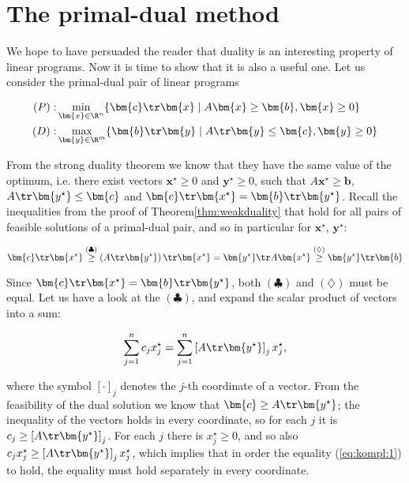 \section{The primal-dual method}

\noindent
We hope to have persuaded the reader that duality is an interesting property of linear programs. 
Now it is time to show that it is also a useful one. Let us consider the primal-dual pair of
linear programs

\begin{eqnarray*}
  (P):&\min\limits_{\bm{x}\in\R^n}\{\bm{c}\tr\bm{x}\mid A\bm{x}\ge\bm{b}, \bm{x}\ge 0\}\\
  (D):&\max\limits_{\bm{y}\in\R^m}\{\bm{b}\tr\bm{y}\mid A\tr\bm{y}\le\bm{c}, \bm{y}\ge 0\}
\end{eqnarray*}

\noindent
From the strong duality theorem we know that they have the same value of the optimum, i.e. there
exist vectors  $\bm{x^\star}\ge0$
and $\bm{y^\star}\ge0$, such that $A\bm{x^\star}\ge\bm{b}$, $A\tr\bm{y^\star}\le\bm{c}$
and $\bm{c}\tr\bm{x^\star}=\bm{b}\tr\bm{y^\star}$.
Recall the inequalities from the proof of Theorem\ref{thm:weakduality} that hold for
all pairs of feasible solutions of a primal-dual pair, and so in particular for $\bm{x^\star}$, $\bm{y^\star}$:

\begin{equation}
  \label{eq:proofSlack}
  \bm{c}\tr\bm{x^\star}\stackrel{(\clubsuit)}{\ge}\left(A\tr\bm{y^\star}\right)\tr\bm{x^\star}
=\bm{y^\star}\tr A\bm{x^\star}\stackrel{(\diamondsuit)}{\ge}\bm{y^\star}\tr\bm{b}
\end{equation}

\noindent
Since $\bm{c}\tr\bm{x^\star}=\bm{b}\tr\bm{y^\star}$, both $(\clubsuit)$ and $(\diamondsuit)$ 
must be equal. Let us have a look at the  $(\clubsuit)$, and expand the scalar product of vectors into a sum:

\begin{equation}
  \label{eq:kompl:1}
  \sum_{j=1}^n c_jx^\star_j=\sum_{j=1}^n\left[A\tr\bm{y^\star}\right]_jx^\star_j,
\end{equation}

\noindent
where the symbol $[\cdot]_j$ denotes the  $j$-th coordinate of a vector. 
From the feasibility of the dual solution we know that
$\bm{c}\ge A\tr\bm{y^\star}$; 
the inequality of the vectors holds in every coordinate, so for each $j$ it is
$c_j\ge\left[A\tr\bm{y^\star}\right]_j$.
For each $j$ there is $x^\star_j\ge0$, and so also  $c_jx^\star_j\ge\left[A\tr\bm{y^\star}\right]_jx^\star_j$,
which implies that in order the equality (\ref{eq:kompl:1}) to hold, the equality must hold separately in every 
coordinate.


